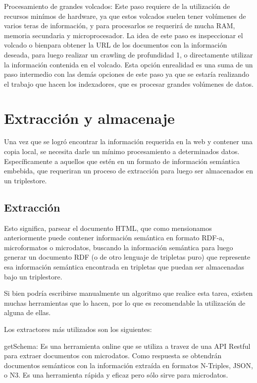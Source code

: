 Procesamiento de grandes volcados: Este paso requiere de la utilización de recursos minímos de hardware, ya que estos volcados suelen tener volúmenes de varios teras de información, y para procesarlos se requerirá 
de mucha RAM, memoria secundaria y microprocesador.
La idea de este paso es inspeccionar el volcado o bienpara obtener la URL de los documentos con la información deseada, para luego realizar un crawling de profundidad 1, 
o directamente utilizar la información contenida en el volcado.
Esta opción enrealidad es una suma de un paso intermedio con las demás opciones de este paso ya que se estaría realizando el trabajo que hacen los indexadores, que es procesar grandes volúmenes de datos.

\section{Extracción y almacenaje}

Una vez que se logró encontrar la información requerida en la web y contener una copia local, se necesita darle un mínimo procesamiento a determinados datos.
Específicamente a aquellos que estén en un formato de información semántica embebida, que requeriran un proceso de extracción para luego ser almacenados en un triplestore.


\subsection{Extracción}

Esto significa, parsear el documento HTML, que como mensionamos anteriormente puede contener información semántica en formato RDF-a, microformatos o microdatos, buscando 
la información semántica para luego generar un documento RDF (o de otro lenguaje de tripletas puro) que represente esa información semántica encontrada en tripletas que puedan ser almacenadas bajo un triplestore.

Si bien podría escribirse manualmente un algoritmo que realice esta tarea, existen muchas herramientas que lo hacen, por lo que es recomendable la utilización de alguna de ellas.

Los extractores más utilizados son los siguientes:

getSchema: Es una herramienta online que se utiliza a travez de una API Restful para extraer documentos con microdatos. Como respuesta se obtendrán documentos semánticos 
con la información extraída en formatos N-Triples, JSON, o N3. 
Es una herramienta rápida y eficaz pero sólo sirve para microdatos.

